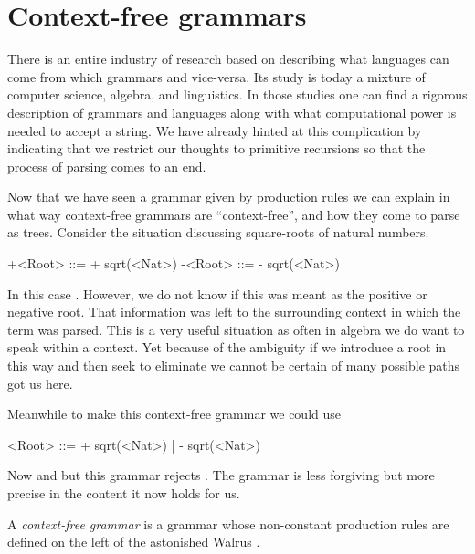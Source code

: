 


\section{Context-free grammars}

There is an entire industry of research based on describing what languages 
can come from which grammars and vice-versa.  Its study is today a mixture 
of computer science, algebra, and linguistics.  In those studies one can 
find a rigorous description of grammars and languages along with what 
computational power is needed to  accept a string.  We have already hinted 
at this complication by indicating that we restrict our thoughts to primitive 
recursions so that the process of parsing comes to an end.


Now that we have seen a grammar given by production rules we can explain 
in what way context-free grammars are ``context-free'', and how they 
come to parse as trees.  Consider the situation discussing square-roots 
of natural numbers.
\begin{center}
\begin{Gcode}[]
+<Root> ::= + sqrt(<Nat>)
-<Root> ::= - sqrt(<Nat>)
\end{Gcode}
\end{center}
In this case .  However, we do not know if this 
was meant as the positive or negative root.  That information 
was left to the surrounding context in which the term was parsed.  
This is a very useful situation as often in algebra we do want to 
speak within a context.  Yet because of the ambiguity if we 
introduce a root in this way and then seek to eliminate we 
cannot be certain of many possible paths got us here.

Meanwhile 
to make this context-free grammar we could use 
\begin{center}
\begin{Gcode}[]
<Root> ::= + sqrt(<Nat>)
         | - sqrt(<Nat>)
\end{Gcode}
\end{center}
Now  and  but 
this grammar rejects .  The grammar is less forgiving 
but more precise in the content it now holds for us.

\begin{definition}
    A \emph{context-free grammar} is a grammar whose non-constant 
    production rules are defined on the left of the astonished Walrus 
    \code{::=}.
\end{definition}

